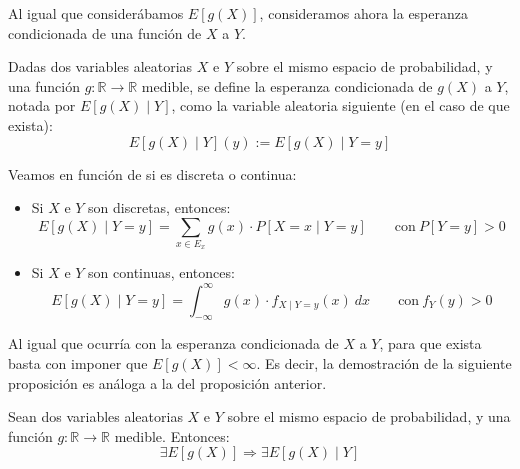 Al igual que considerábamos $E[g(X)]$, consideramos ahora la esperanza condicionada de una función de $X$ a $Y$.
\begin{definicion}
    Dadas dos variables aleatorias $X$ e $Y$ sobre el mismo espacio de probabilidad, y una función $g:\mathbb{R}\to\mathbb{R}$ medible, se define la esperanza condicionada de $g(X)$ a $Y$, notada por $E[g(X)\mid Y]$, como la variable aleatoria siguiente (en el caso de que exista):
    \begin{equation*}
        E[g(X)\mid Y](y) := E[g(X)\mid Y = y]
    \end{equation*}

    Veamos en función de si es discreta o continua:
    \begin{itemize}
        \item Si $X$ e $Y$ son discretas, entonces:
        \begin{equation*}
            E[g(X)\mid Y = y] = \sum_{x\in E_x} g(x)\cdot P[X = x\mid Y = y] \qquad \text{con}~P[Y=y]>0
        \end{equation*}
        \item Si $X$ e $Y$ son continuas, entonces:
        \begin{equation*}
            E[g(X)\mid Y = y] = \int_{-\infty}^{\infty} g(x)\cdot f_{X\mid Y=y}(x)~dx \qquad \text{con}~f_Y(y)>0
        \end{equation*}
    \end{itemize}
\end{definicion}

Al igual que ocurría con la esperanza condicionada de $X$ a $Y$, para que exista basta con imponer que $E[g(X)]<\infty$. Es decir, la demostración de la siguiente proposición es análoga a la del proposición anterior.
\begin{prop}
    Sean dos variables aleatorias $X$ e $Y$ sobre el mismo espacio de probabilidad, y una función $g:\mathbb{R}\to\mathbb{R}$ medible. Entonces:
    \begin{equation*}
        \exists E[g(X)] \Longrightarrow \exists E[g(X)\mid Y]
    \end{equation*}
\end{prop}


